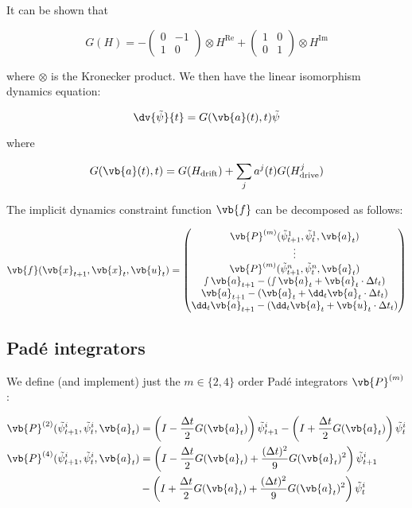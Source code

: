\documentclass{article}
\newcommand{\isopsi}{\tilde \psi}
\begin{document}
It can be shown that

$$
G(H) =  - \begin{pmatrix} 0 & -1 \\ 1 & 0 \end{pmatrix} \otimes H^{\mathrm{Re}} + \begin{pmatrix} 1 & 0 \\ 0 &1 \end{pmatrix} \otimes H^{\mathrm{Im}}
$$

where $\otimes$ is the Kronecker product.  We then have the linear isomorphism dynamics equation:

$$
\dv{\isopsi}{t} = G(\vb{a}(t),t) \isopsi
$$

where

$$
G(\vb{a}(t),t) = G(H_{\text{drift}}) + \sum_j a^j(t) G(H_{\text{drive}}^j) 
$$

The implicit dynamics constraint function $\vb{f}$ can be decomposed as follows:

$$
\vb{f}(\vb{x}_{t+1}, \vb{x}_t, \vb{u}_t) 
= \begin{pmatrix} 
  \vb{P}^{(m)} (\isopsi^1_{t+1}, \isopsi^1_t, \vb{a}_t) \\ 
  \vdots \\
  \vb{P}^{(m)} (\isopsi^n_{t+1}, \isopsi^n_t, \vb{a}_t) \\
  \smallint \vb{a}_{t+1} - \left(\smallint \vb{a}_t + \vb{a}_t \cdot \Delta t_t  \right) \\
  \vb{a}_{t+1} - \left(\vb{a}_t + \dd_t \vb{a}_t \cdot \Delta t_t  \right) \\
  \dd_t \vb{a}_{t+1} - \left(\dd_t \vb{a}_t + \vb{u}_t \cdot \Delta t_t \right)
  \end{pmatrix}
$$

\newpage
\subsection{Pad\'e integrators}

We define (and implement) just the $m \in \{2, 4\}$ order Pad\'e integrators $\vb{P}^{(m)}$:

\begin{align*}
  \vb{P}^{(2)}(\isopsi^i_{t+1}, \isopsi^i_t, \vb{a}_t) &= \left(I - \frac{\Delta t}{2} G(\vb{a}_t) \right) \isopsi^i_{t+1} -  \left(I + \frac{\Delta t}{2} G(\vb{a}_t) \right) \isopsi^i_{t}\\   
  \vb{P}^{(4)}(\isopsi^i_{t+1}, \isopsi^i_t, \vb{a}_t) &= \left(I - \frac{\Delta t}{2} G(\vb{a}_t) + \frac{(\Delta t)^2}{9} G(\vb{a}_t)^2\right) \isopsi^i_{t+1} \\ 
  &- \left(I + \frac{\Delta t}{2} G(\vb{a}_t) + \frac{(\Delta t)^2}{9} G(\vb{a}_t)^2\right) \isopsi^i_t 
\end{align*}
\end{document}
